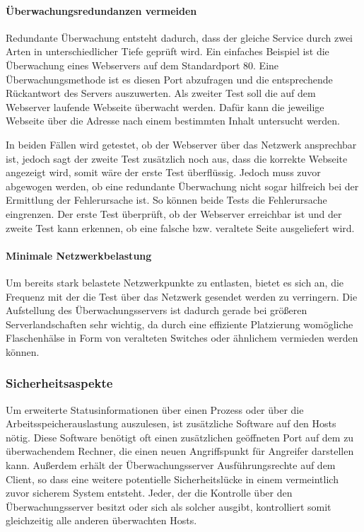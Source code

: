 \paragraph{Überwachungsredundanzen vermeiden}
Redundante Überwachung entsteht dadurch, dass der gleiche Service durch zwei Arten in unterschiedlicher Tiefe geprüft wird.
Ein einfaches Beispiel ist die Überwachung eines Webservers auf dem Standardport 80.
Eine Überwachungsmethode ist es diesen Port abzufragen und die entsprechende Rückantwort des Servers auszuwerten.
Als zweiter Test soll die auf dem Webserver laufende Webseite überwacht werden. 
Dafür kann die jeweilige Webseite über die Adresse nach einem bestimmten Inhalt untersucht werden.

In beiden Fällen wird getestet, ob der Webserver über das Netzwerk ansprechbar ist, jedoch sagt der zweite Test zusätzlich noch aus, dass die korrekte Webseite angezeigt wird, somit wäre der erste Test überflüssig.
Jedoch muss zuvor abgewogen werden, ob eine redundante Überwachung nicht sogar hilfreich bei der Ermittlung der Fehlerursache ist.
So können beide Tests die Fehlerursache eingrenzen.
Der erste Test überprüft, ob der Webserver erreichbar ist und der zweite Test kann erkennen, ob eine falsche bzw. veraltete Seite ausgeliefert wird.

\paragraph{Minimale Netzwerkbelastung}
Um bereits stark belastete Netzwerkpunkte zu entlasten, bietet es sich an, die Frequenz mit der die Test über das Netzwerk gesendet werden zu verringern.
Die Aufstellung des Überwachungsservers ist dadurch gerade bei größeren Serverlandschaften sehr wichtig, da durch eine effiziente Platzierung womögliche Flaschenhälse  in Form von veralteten Switches oder ähnlichem vermieden werden können.

\subsubsection{Sicherheitsaspekte}
Um erweiterte Statusinformationen über einen Prozess oder über die Arbeitsspeicherauslastung auszulesen, ist zusätzliche Software auf den Hosts nötig.
Diese Software benötigt oft einen zusätzlichen geöffneten Port auf dem zu überwachendem Rechner, die einen neuen Angriffspunkt für Angreifer darstellen kann.
Außerdem erhält der Überwachungsserver Ausführungsrechte auf dem Client, so dass eine weitere potentielle Sicherheitslücke in einem vermeintlich zuvor sicherem System entsteht.
Jeder, der die Kontrolle über den Überwachungsserver besitzt oder sich als solcher ausgibt, kontrolliert somit gleichzeitig alle anderen überwachten Hosts.

